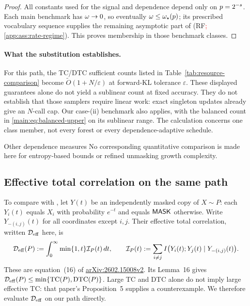 \begin{proof}
All constants used for the signal and dependence depend only on
$p=2^{-s}$.  Each main benchmark has
$\omega\to0$, so eventually $\omega\le\omega_\star(p)$;
its prescribed vocabulary sequence supplies the remaining asymptotic
part of (RF\textcolor{red}{; \cref{app:ass:rate-regime}}).  This proves membership in those benchmark classes.
\end{proof}

\paragraph{What the substitution establishes.}
For this path, the TC/DTC sufficient counts listed in
Table~\ref{tab:resource-comparison} become
$\widetilde O(1+N/\varepsilon)$ at forward-KL tolerance $\varepsilon$.
These displayed guarantees alone do not yield a sublinear count at fixed
accuracy.  They do not establish that those samplers require linear work:
exact singleton updates already give an $N$-call cap.
Our case-(ii) benchmark also applies, with the balanced count in
\eqref{main:eq:balanced-upper} on its sublinear range.
The calculation concerns one class member, not every forest or every
dependence-adaptive schedule.

\begin{proposalcontext}{Other dependence measures}
No corresponding quantitative comparison is made here for entropy-based
bounds or refined unmasking growth complexity.
\end{proposalcontext}

\subsection{Effective total correlation on the same path}
\label{app:comparison-effective-tc}

To compare with \citet{dmitriev2026efficient}, let $Y(t)$ be an
independently masked copy of $X\sim P$: each $Y_i(t)$ equals $X_i$
with probability $e^{-t}$ and equals $\mathsf{MASK}$ otherwise.
Write $Y_{-(i,j)}(t)$ for all coordinates except $i,j$.
Their effective total correlation, written $\mathcal D_{\mathrm{eff}}$ here, is
\begin{equation}
 \mathcal D_{\mathrm{eff}}(P)
 :=\int_0^\infty\min\{1,t\}\mathcal I_P(t)\,dt,
 \qquad
 \mathcal I_P(t)
 :=\sum_{i\ne j}I\bigl(Y_i(t);Y_j(t)\mid Y_{-(i,j)}(t)\bigr).
 \label{app:eq:effective-tc-definition}
\end{equation}
These are equation~(16) of
\href{https://arxiv.org/html/2602.15008v2}{arXiv:2602.15008v2}.
Its Lemma~16 gives
$\mathcal D_{\mathrm{eff}}(P)\le\min\{\mathrm{TC}(P),\mathrm{DTC}(P)\}$.
Large TC and DTC alone do not imply large effective TC: that paper's
Proposition~5 supplies a counterexample. We therefore evaluate
$\mathcal D_{\mathrm{eff}}$ on our path directly.

